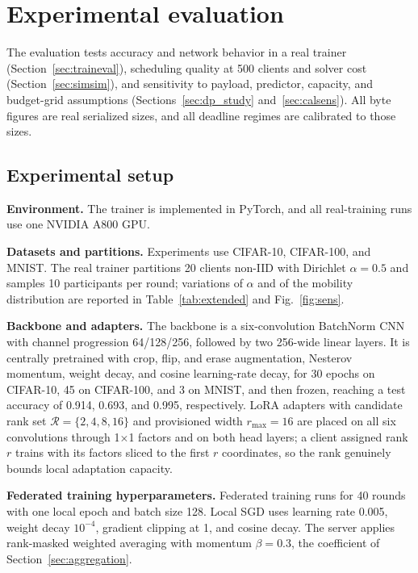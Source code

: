\documentclass[a4paper,fleqn]{cas-dc}
\begin{document}
\section{Experimental evaluation}
\label{sec:eval}

The evaluation tests accuracy and network behavior in a real trainer (Section~\ref{sec:traineval}), scheduling quality at 500 clients and solver cost (Section~\ref{sec:simsim}), and sensitivity to payload, predictor, capacity, and budget-grid assumptions (Sections~\ref{sec:dp_study} and~\ref{sec:calsens}). All byte figures are real serialized sizes, and all deadline regimes are calibrated to those sizes.

\subsection{Experimental setup}
\textbf{Environment.} The trainer is implemented in PyTorch, and all real-training runs use one NVIDIA A800 GPU.

\textbf{Datasets and partitions.} Experiments use CIFAR-10, CIFAR-100, and MNIST. The real trainer partitions 20 clients non-IID with Dirichlet $\alpha=0.5$ and samples 10 participants per round; variations of $\alpha$ and of the mobility distribution are reported in Table~\ref{tab:extended} and Fig.~\ref{fig:sens}.

\textbf{Backbone and adapters.} The backbone is a six-convolution BatchNorm CNN with channel progression 64/128/256, followed by two 256-wide linear layers. It is centrally pretrained with crop, flip, and erase augmentation, Nesterov momentum, weight decay, and cosine learning-rate decay, for 30 epochs on CIFAR-10, 45 on CIFAR-100, and 3 on MNIST, and then frozen, reaching a test accuracy of 0.914, 0.693, and 0.995, respectively. LoRA adapters with candidate rank set $\mathcal R=\{2,4,8,16\}$ and provisioned width $r_{\max}=16$ are placed on all six convolutions through 1$\times$1 factors and on both head layers; a client assigned rank $r$ trains with its factors sliced to the first $r$ coordinates, so the rank genuinely bounds local adaptation capacity.

\textbf{Federated training hyperparameters.} Federated training runs for 40 rounds with one local epoch and batch size 128. Local SGD uses learning rate 0.005, weight decay $10^{-4}$, gradient clipping at 1, and cosine decay. The server applies rank-masked weighted averaging with momentum $\beta{=}0.3$, the coefficient of Section~\ref{sec:aggregation}.
\end{document}
